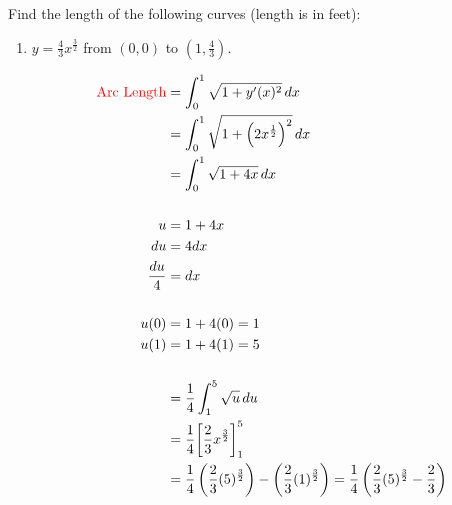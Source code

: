 \documentclass[noinstructornotes]{ximera}
\begin{document}
\begin{problem}
Find the length of the following curves (length is in feet):
	\begin{enumerate}
		\item  $y = \frac{4}{3} x^\frac{3}{2}$ from $\left( 0, 0 \right)$ to $\left( 1, \frac{4}{3} \right)$.  
		\begin{freeResponse}
			\begin{align*}
			\text{{\color{red} Arc Length}} &= \int_0^1 \sqrt{1+y'(x)^2} \,d x  \\
			&= \int_0^1 \sqrt{1+ \left( 2x^{\frac{1}{2}}\right)^2} \,d x  \\
			&=  \int_0^1 \sqrt{1+ 4x} \,d x  \\
			& \\
			u &= 1+4x\\
			du &= 4dx \\
			\frac{du}{4} &= dx \\
			& \\
			u(0) &= 1 + 4(0) =1\\
			u(1) &= 1 +4(1) = 5\\
			& \\
			&= \frac{1}{4} \int_1^5 \sqrt{u} \,d u  \\
			&= \frac{1}{4} \bigg[ \frac{2}{3}x^{\frac{3}{2}} \bigg]_1^5  \\
			&= \frac{1}{4} \left( \frac{2}{3}(5)^{\frac{3}{2}} \right) - \left( \frac{2}{3}(1)^{\frac{3}{2}} \right)  
			=\frac{1}{4} \left( \frac{2}{3}(5)^{\frac{3}{2}}  -  \frac{2}{3} \right)
			\end{align*}
		\end{freeResponse}
		
		
		

\end{enumerate}
\end{problem}
\end{document}
